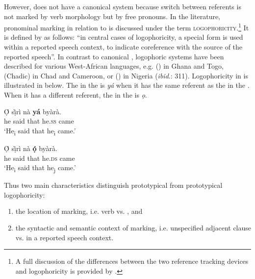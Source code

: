 \documentclass[output=paper
,newtxmath
,modfonts
,nonflat]{langsci/langscibook}
\begin{document}
However,  does not have a canonical  system because switch between referents is not marked by verb morphology but by free pronouns. In the literature, pronominal marking in relation to  is discussed under the term \textsc{logophoricity}.\footnote{A full discussion of the differences between the two reference tracking devices  and logophoricity is provided by \citet[50-56]{Stirling1993}.} It is defined by \citet[1]{Stirling1993} as follows: “in central cases of logophoricity, a special  form is used within a reported speech context, to indicate coreference with the source of the reported speech”. In contrast to canonical , logophoric systems have been described for various West-African languages, e.g.  () in Ghana and Togo,  (Chadic) in Chad and Cameroon, or  () in Nigeria (\textit{ibid}.: 311). Logophoricity in  is illustrated in  below. The   in the  is \textit{yá} when it has the same referent as the  in the . When it has a different referent, the  in the  is \textit{ọ}.

\ea\label{ex:apel:19}
{ \citep[19]{HymanComrie81}}
\ea\label{ex:apel:19a}
\gll Ọ́ s\`ịr\`i   nà  \textbf{yá} byàrà. \\
     he said that he.\textsc{ss} came \\
\glt ‘He\textsubscript{i} said that he\textsubscript{i} came.’


\ex\label{ex:apel:19b}
\gll Ọ́ sị̀rì  nà  \textbf{ọ́} byàrà.\\
     he said that he.\textsc{ds} came \\
\glt ‘He\textsubscript{i} said that he\textsubscript{j} came.’
\z
\z

Thus two main characteristics distinguish prototypical  from prototypical logophoricity: 

\begin{enumerate}
\item the location of marking, i.e. verb vs. , and 

\item the syntactic and semantic context of marking, i.e. unspecified adjacent clause vs.  in a reported speech context.
\end{enumerate}
\end{document}
